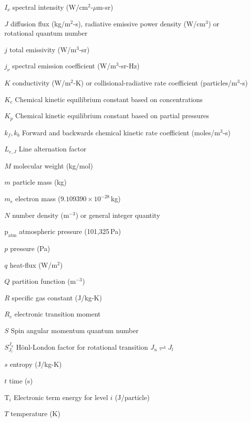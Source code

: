 \begin{list}{}{%
\setlength{\labelwidth}{35mm}
\setlength{\leftmargin}{45mm}}
 \item[$I_\nu$\dotfill] spectral intensity (W/cm$^2$-$\mu$m-sr) 
  \item[$J$\dotfill] diffusion flux (kg/m$^2$-s), radiative emissive power density (W/cm$^3$) or rotational quantum number
  \item[$j$\dotfill] total emissivity (W/m$^3$-sr) 
  \item[$j_\nu$\dotfill] spectral emission coefficient (W/m$^3$-sr-Hz)
 \item[$K$\dotfill] conductivity (W/m$^2$-K) or collisional-radiative rate coefficient (particles/m$^3$-s)
  \item[$K_c$\dotfill] Chemical kinetic equilibrium constant based on concentrations
  \item[$K_p$\dotfill] Chemical kinetic equilibrium constant based on partial pressures
  \item[$k_f,k_b$\dotfill] Forward and backwards chemical kinetic rate coefficient (moles/m$^3$-s)
  \item[$L_{e,J}$\dotfill] Line alternation factor
  \item[$M$\dotfill] molecular weight (kg/mol)
 \item[$m$\dotfill] particle mass (kg)
 \item[$m_e$\dotfill] electron mass ($9.109390 \times 10^{-28}$\,kg)
 \item[$N$\dotfill] number density (m$^{-3}$) or general integer quantity
 \item[$\mathrm{p}_\text{atm}$\dotfill] atmospheric pressure (101,325\,Pa)
 \item[$p$\dotfill] pressure (Pa)
 \item[$q$\dotfill] heat-flux (W/m$^2$)
 \item[$Q$\dotfill] partition function (m$^{-3}$)
 \item[$R$\dotfill] specific gas constant (J/kg-K)
 \item[$R_e$\dotfill] electronic transition moment
  \item[$S$\dotfill] Spin angular momentum quantum number
 \item[$S^{J_u}_{J_l}$\dotfill] H\"{o}nl-London factor for rotational transition $J_u \rightleftharpoons J_l$
 \item[$s$\dotfill] entropy (J/kg-K)
 \item[$t$\dotfill] time (s)
  \item[$\mathrm{T}_{i}$\dotfill] Electronic term energy for level $i$ (J/particle)
 \item[$T$\dotfill] temperature (K)

\end{list}
